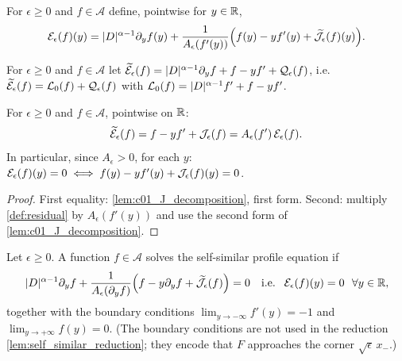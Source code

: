 \begin{definition}
  \label{def:residual}
  For $\epsilon\ge0$ and $f\in\mathcal A$ define, pointwise for $y\in\mathbb{R}$,
  \[
    \mathcal{E}_\epsilon(f)(y)=|D|^{\alpha-1}\partial_yf(y)+\frac1{A_\epsilon(f'(y))}
    \Bigl(f(y)-yf'(y)+\widetilde{\mathcal{J}}_\epsilon(f)(y)\Bigr).
  \]
\end{definition}

\begin{definition}
  \label{def:c01_quasilinear_residual}
  For $\epsilon\ge0$ and $f\in\mathcal A$ let
  $\widetilde{\mathcal{E}}_\epsilon(f)=|D|^{\alpha-1}\partial_yf+f-yf'+\mathcal{Q}_\epsilon(f)$, i.e.\
  $\widetilde{\mathcal{E}}_\epsilon(f)=\mathcal{L}_0(f)+\mathcal{Q}_\epsilon(f)$ with $\mathcal{L}_0(f)=|D|^{\alpha-1}f'+f-yf'$.
\end{definition}

\begin{lemma}
  \label{lem:c01_residual_identity}
  For $\epsilon\ge0$ and $f\in\mathcal A$, pointwise on $\mathbb{R}$:
  \[
    \widetilde{\mathcal{E}}_\epsilon(f)=f-yf'+\mathcal{J}_\epsilon(f)=A_\epsilon(f')\,\mathcal{E}_\epsilon(f).
  \]
  In particular, since $A_\epsilon>0$, for each $y$: $\mathcal{E}_\epsilon(f)(y)=0\iff
  f(y)-yf'(y)+\mathcal{J}_\epsilon(f)(y)=0$.
\end{lemma}
\begin{proof}
  First equality: \cref{lem:c01_J_decomposition}, first form.  Second: multiply
  \cref{def:residual} by $A_\epsilon(f'(y))$ and use the second form of \cref{lem:c01_J_decomposition}.
\end{proof}

\begin{definition}
  \label{def:profile_equation}
  Let $\epsilon\ge0$.  A function $f\in\mathcal A$ solves the self-similar profile equation if
  \begin{equation}\label{eqn:main_ideas_self_similar_front_equation_semilinear}
    |D|^{\alpha-1}\partial_yf+\frac{1}{A_\epsilon(\partial_yf)}\Bigl(f-y\partial_yf+\widetilde{\mathcal{J}}_\epsilon(f)\Bigr)=0
    \quad\text{i.e. }\ \mathcal{E}_\epsilon(f)(y)=0\ \ \forall y\in\mathbb{R},
  \end{equation}
  together with the boundary conditions $\lim_{y\to-\infty}f'(y)=-1$ and
  $\lim_{y\to+\infty}f(y)=0$.  (The boundary conditions are not used in the reduction
  \cref{lem:self_similar_reduction}; they encode that $F$ approaches the corner $\sqrt\epsilon\,x_-$.)
\end{definition}

